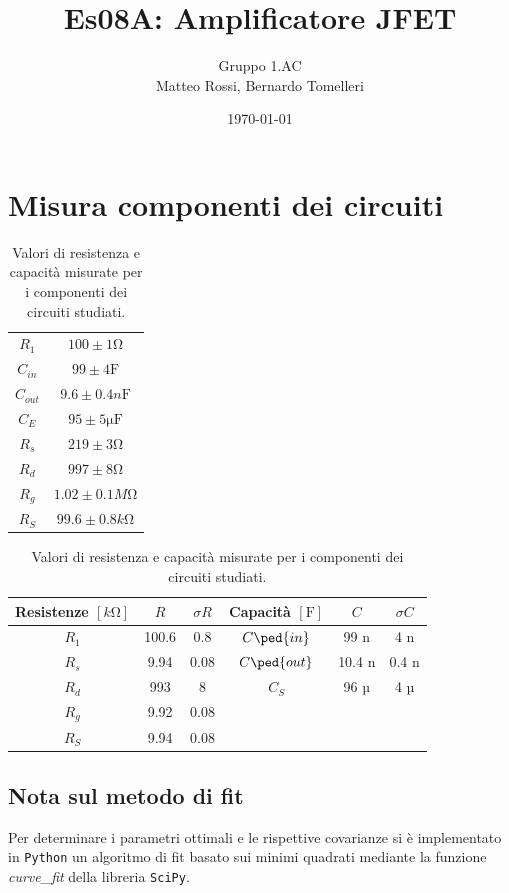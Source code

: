 \documentclass[10pt, a4paper, italian]{article}
\author{Gruppo 1.AC \\ Matteo Rossi, Bernardo Tomelleri}
\title{Es08A: Amplificatore JFET}
\begin{document}
\date{\today}
\maketitle

\setcounter{section}{0}

\section*{Misura componenti dei circuiti}
\begin{table}[htbp]
\centering
\begin{tabular}{cc}
\midrule
$R_1$	  	& $100 \pm 1 \si{\ohm}$\\
$C_{in}$	  	& $99 \pm 4 \si{\F}$	\\
$C_{out}$	& $9.6 \pm 0.4 \si{n\F}$	\\
$C_E$	  	& $95 \pm 5 \si{\micro \F}$\\
$R_s$	  	& $219 \pm 3 \si{\ohm}$	\\
$R_d$	  	& $997 \pm 8 \si{\ohm}$\\
$R_g$	  	& $1.02 \pm 0.1 \si{M\ohm}$\\
$R_S$	  	& $99.6 \pm 0.8 \si{k\ohm}$\\

\bottomrule     
\end{tabular}
\caption{Valori di resistenza e capacità misurate per i componenti dei
circuiti studiati. \label{tab: rcmes_M}}
\end{table}

\begin{table}[htbp]
\centering
\begin{tabular}{cccccc}
\toprule
Resistenze $[\si{k\ohm}]$ & $R$ & $\sigma R$ & Capacità $[\si{\F}]$ & $C$ &
$\sigma C$ \\
\midrule
\midrule
$R_1$	  & 100.6 	& 0.8 	 & $C\ped{in}$ & 99	n	 & 4 n \\
$R_s$	  & 9.94	& 0.08 	 & $C\ped{out}$ & 10.4 n	 & 0.4 n \\
$R_d$	  & 993		& 8	 	 & $C_S$ 		& 96  µ  & 4 µ \\
$R_g$	  & 9.92	& 0.08	 & & & \\
$R_S$	  & 9.94	& 0.08	 & & & \\
\bottomrule     
\end{tabular}
\caption{Valori di resistenza e capacità misurate per i componenti dei
circuiti studiati. \label{tab: rcmes_B}}
\end{table}

\subsection*{Nota sul metodo di fit}
Per determinare i parametri ottimali e le rispettive covarianze si \`e
implementato in \verb+Python+ un algoritmo di fit basato sui minimi quadrati
mediante la funzione \emph{curve\_fit} della libreria \texttt{SciPy}.
\end{document}
